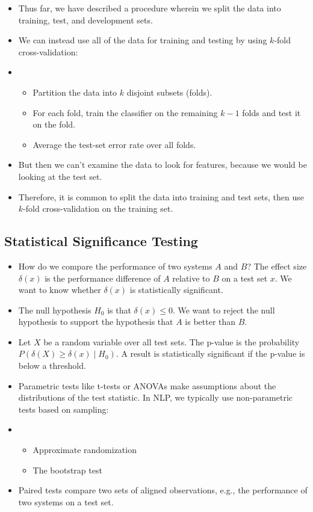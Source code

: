 \begin{itemize}
  \item Thus far, we have described a procedure wherein we split the data into training, test, and development sets.
  \item We can instead use all of the data for training and testing by using $k$-fold cross-validation:
  \item[]
        \begin{itemize}
          \item Partition the data into $k$ disjoint subsets (folds).
          \item For each fold, train the classifier on the remaining $k - 1$ folds and test it on the fold.
          \item Average the test-set error rate over all folds.
        \end{itemize}
  \item But then we can't examine the data to look for features, because we would be looking at the test set.
  \item Therefore, it is common to split the data into training and test sets, then use $k$-fold cross-validation on the training set.
\end{itemize}

\subsection{Statistical Significance Testing}

\begin{itemize}
  \item How do we compare the performance of two systems $A$ and $B$?
        The effect size $\delta(x)$ is the performance difference of $A$ relative to
        $B$ on a test set $x$.
        We want to know whether $\delta(x)$ is statistically significant.
  \item The null hypothesis $H_0$ is that $\delta(x) \leq 0$.
        We want to reject the null hypothesis to support the hypothesis that $A$ is
        better than $B$.
  \item Let $X$ be a random variable over all test sets.
        The p-value is the probability $P(\delta(X) \geq \delta(x) \mid H_0)$.
        A result is statistically significant if the p-value is below a threshold.
  \item Parametric tests like t-tests or ANOVAs make assumptions about the distributions of the test statistic.
        In NLP, we typically use non-parametric tests based on sampling:
  \item[]
        \begin{itemize}
          \item Approximate randomization
          \item The bootstrap test
        \end{itemize}
  \item Paired tests compare two sets of aligned observations, e.g., the performance of two systems on a test set.
\end{itemize}

